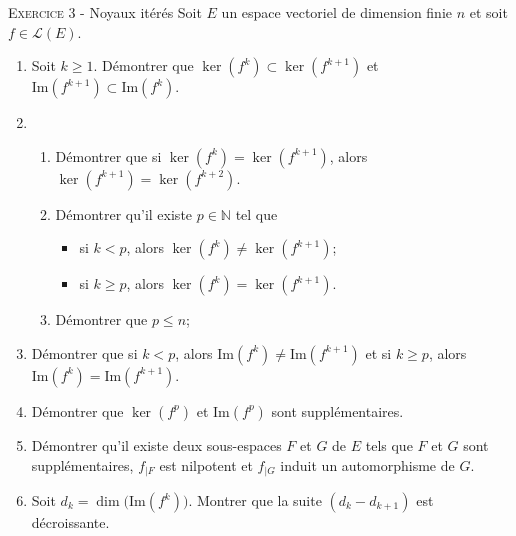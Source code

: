 \label{key}\documentclass[11pt]{article}
\begin{document}
\vskip0.3cm\noindent\textsc{Exercice 3} - Noyaux itérés
\vskip0.2cm
Soit $E$ un espace vectoriel de dimension finie $n$ et soit $f\in\mathcal L(E)$.
\begin{enumerate}
\item Soit $k\geq 1$. Démontrer que $\ker(f^{k})\subset \ker(f^{k+1})$ 
et $\textrm{Im}(f^{k+1})\subset \textrm{Im}(f^k).$
\item \begin{enumerate}
\item Démontrer que si $\ker(f^k)=\ker(f^{k+1})$, alors $\ker(f^{k+1})= \ker(f^{k+2})$.
\item Démontrer qu'il existe $p\in\mathbb N$ tel que
\begin{itemize}
\item si $k<p$, alors $\ker(f^k)\neq \ker(f^{k+1})$;
\item si $k\geq p$, alors $\ker(f^k)= \ker(f^{k+1})$.
\end{itemize}
\item Démontrer que $p\leq n$;
\end{enumerate}
\item Démontrer que si $k<p$, alors $\textrm{Im}(f^k)\neq \textrm{Im}(f^{k+1})$ et
si $k\geq p$, alors $\textrm{Im}(f^k)=\textrm{Im}(f^{k+1})$.
\item Démontrer que $\ker(f^p)$ et $\textrm{Im}(f^p)$ sont supplémentaires.
\item Démontrer qu'il existe deux sous-espaces $F$ et $G$ de $E$ tels que $F$ et $G$ sont supplémentaires, $f_{|F}$ est nilpotent et $f_{|G}$ induit un automorphisme de $G$.
\item Soit $d_k=\dim\big(\textrm{Im}(f^k)\big)$. Montrer que la suite $(d_k-d_{k+1})$ est décroissante.
\end{enumerate}




\vskip0.5cm

\end{document}
